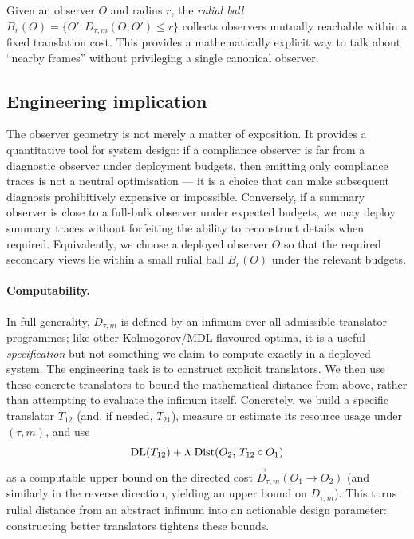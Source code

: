 \documentclass{aion}
\begin{document}
\begin{remark}
Given an observer $O$ and radius $r$, the \emph{rulial ball} $B_r(O)=\{O':D_{\tau,m}(O,O')\le r\}$
collects observers mutually reachable within a fixed translation cost.
This provides a mathematically explicit way to talk about ``nearby frames'' without privileging a single canonical observer.
\end{remark}

\subsection{Engineering implication}
The observer geometry is not merely a matter of exposition.
It provides a quantitative tool for system design:
if a compliance observer is far from a diagnostic observer under deployment budgets,
then emitting only compliance traces is not a neutral optimisation --- it is a choice that can make subsequent diagnosis prohibitively expensive or impossible.
Conversely, if a summary observer is close to a full-bulk observer under expected budgets, we may deploy summary traces
without forfeiting the ability to reconstruct details when required.
Equivalently, we choose a deployed observer $O$ so that the required secondary views lie within a small rulial ball $B_r(O)$ under the relevant budgets.

\paragraph{Computability.}
In full generality, $D_{\tau,m}$ is defined by an infimum over all admissible translator programmes; like other Kolmogorov/MDL-flavoured optima,
it is a useful \emph{specification} but not something we claim to compute exactly in a deployed system.
The engineering task is to construct explicit translators.
We then use these concrete translators to bound the mathematical distance from above, rather than attempting to evaluate the infimum itself.
Concretely, we build a specific translator $T_{12}$ (and, if needed, $T_{21}$), measure or estimate its resource usage under $(\tau,m)$, and use
\[
  \operatorname{DL}(T_{12}) + \lambda\,\operatorname{Dist}(O_2,\,T_{12}\circ O_1)
\]
as a computable upper bound on the directed cost $\vec{D}_{\tau,m}(O_1\!\to\! O_2)$ (and similarly in the reverse direction, yielding an upper bound on $D_{\tau,m}$).
This turns rulial distance from an abstract infimum into an actionable design parameter: constructing better translators tightens these bounds.
\end{document}
